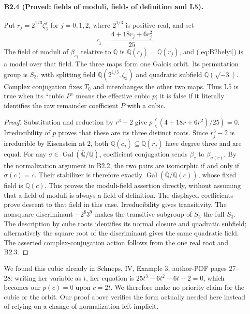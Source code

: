 \paragraph{B2.4 (Proved: fields of moduli, fields of definition and L5).}
Put $r_j=2^{1/3}\zeta_3^j$ for $j=0,1,2$, where $2^{1/3}$ is positive
real, and set
\[
 c_j=\frac{4+18r_j+6r_j^2}{25}.
\]
The field of moduli of $\beta_{c_j}$ relative to $\mathbb Q$ is
$\mathbb Q(c_j)=\mathbb Q(r_j)$, and (\ref{eq:B2belyi}) is a model
over that field. The three maps form one Galois orbit. Its permutation
group is $S_3$, with splitting field
$\mathbb Q(2^{1/3},\zeta_3)$ and quadratic subfield
$\mathbb Q(\sqrt{-3})$. Complex conjugation fixes $T_0$ and interchanges
the other two maps. Thus L5 is true when its ``cubic $P$'' means the
effective cubic $p$; it is false if it literally identifies the raw
remainder coefficient $P$ with a cubic.

\begin{proof}
Substitution and reduction by $r^3-2$ give $p((4+18r+6r^2)/25)=0$.
Irreducibility of $p$ proves that these are its three distinct roots.
Since $r_j^3-2$ is irreducible by Eisenstein at 2, both
$\mathbb Q(c_j)\subseteq\mathbb Q(r_j)$ have degree three and are
equal. For any $\sigma\in\operatorname{Gal}(\overline{\mathbb Q}/\mathbb Q)$,
coefficient conjugation sends $\beta_c$ to $\beta_{\sigma(c)}$.
By the normalization argument in B2.2, the two pairs are isomorphic
if and only if $\sigma(c)=c$. Their stabilizer is therefore exactly
$\operatorname{Gal}(\overline{\mathbb Q}/\mathbb Q(c))$, whose fixed
field is $\mathbb Q(c)$. This proves the moduli-field assertion directly,
without assuming that a field of moduli is always a field of definition.
The displayed coefficients prove descent to that field in this case.
Irreducibility gives transitivity. The nonsquare discriminant
$-2^8 3^9$ makes the transitive subgroup of $S_3$ the full $S_3$.
The description by cube roots identifies its normal closure and
quadratic subfield; alternatively the square root of the discriminant
gives the same quadratic field. The asserted complex-conjugation
action follows from the one real root and B2.3.
\end{proof}

We found this cubic already in Schneps, IV, Example 3, author-PDF
pages 27--28: writing her variable as $t$, her equation is
$25t^3-6t^2-6t-2=0$, which becomes our $p(c)=0$ upon $c=2t$.
We therefore make no priority claim for
the cubic or the orbit. Our proof above verifies the form actually
needed here instead of relying on a change of normalization left implicit.

